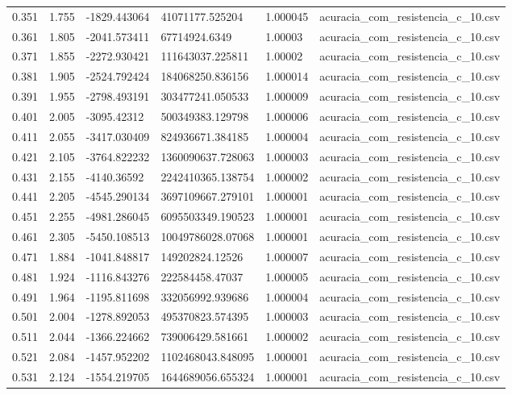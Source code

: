 \begin{table}
\begin{tabular}{llllll}
0.351 & 1.755 & -1829.443064 & 41071177.525204 & 1.000045 & acuracia\_com\_resistencia\_c\_10.csv \\
0.361 & 1.805 & -2041.573411 & 67714924.6349 & 1.00003 & acuracia\_com\_resistencia\_c\_10.csv \\
0.371 & 1.855 & -2272.930421 & 111643037.225811 & 1.00002 & acuracia\_com\_resistencia\_c\_10.csv \\
0.381 & 1.905 & -2524.792424 & 184068250.836156 & 1.000014 & acuracia\_com\_resistencia\_c\_10.csv \\
0.391 & 1.955 & -2798.493191 & 303477241.050533 & 1.000009 & acuracia\_com\_resistencia\_c\_10.csv \\
0.401 & 2.005 & -3095.42312 & 500349383.129798 & 1.000006 & acuracia\_com\_resistencia\_c\_10.csv \\
0.411 & 2.055 & -3417.030409 & 824936671.384185 & 1.000004 & acuracia\_com\_resistencia\_c\_10.csv \\
0.421 & 2.105 & -3764.822232 & 1360090637.728063 & 1.000003 & acuracia\_com\_resistencia\_c\_10.csv \\
0.431 & 2.155 & -4140.36592 & 2242410365.138754 & 1.000002 & acuracia\_com\_resistencia\_c\_10.csv \\
0.441 & 2.205 & -4545.290134 & 3697109667.279101 & 1.000001 & acuracia\_com\_resistencia\_c\_10.csv \\
0.451 & 2.255 & -4981.286045 & 6095503349.190523 & 1.000001 & acuracia\_com\_resistencia\_c\_10.csv \\
0.461 & 2.305 & -5450.108513 & 10049786028.07068 & 1.000001 & acuracia\_com\_resistencia\_c\_10.csv \\
0.471 & 1.884 & -1041.848817 & 149202824.12526 & 1.000007 & acuracia\_com\_resistencia\_c\_10.csv \\
0.481 & 1.924 & -1116.843276 & 222584458.47037 & 1.000005 & acuracia\_com\_resistencia\_c\_10.csv \\
0.491 & 1.964 & -1195.811698 & 332056992.939686 & 1.000004 & acuracia\_com\_resistencia\_c\_10.csv \\
0.501 & 2.004 & -1278.892053 & 495370823.574395 & 1.000003 & acuracia\_com\_resistencia\_c\_10.csv \\
0.511 & 2.044 & -1366.224662 & 739006429.581661 & 1.000002 & acuracia\_com\_resistencia\_c\_10.csv \\
0.521 & 2.084 & -1457.952202 & 1102468043.848095 & 1.000001 & acuracia\_com\_resistencia\_c\_10.csv \\
0.531 & 2.124 & -1554.219705 & 1644689056.655324 & 1.000001 & acuracia\_com\_resistencia\_c\_10.csv \\

\end{tabular}
\end{table}
